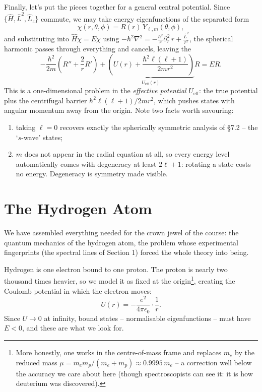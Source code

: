 \documentclass[a4paper]{scrartcl}
\begin{document}
Finally, let's put the pieces together for a general central potential. Since $\{\hat H, \hat L^2, \hat L_z\}$ commute, we may take energy eigenfunctions of the separated form
$$
\chi(r, \theta, \phi) = R(r) \, Y_{\ell, m}(\theta, \phi),
$$
and substituting into $\hat{H}\chi = E\chi$ using $-\hbar^2\nabla^2 = -\frac{\hbar^2}{r}\partial_r^2 \, r + \frac{\hat{L}^2}{r^2}$, the spherical harmonic passes through everything and cancels, leaving the 
$$
-\frac{\hbar^2}{2m}\left( R'' + \frac{2}{r}R' \right) + \underbrace{\left( U(r) + \frac{\hbar^2 \ell(\ell+1)}{2mr^2} \right)}_{U_{\text{eff}}(r)} R = E R.
$$
This is a one-dimensional problem in the \emph{effective potential} $U_{\text{eff}}$: the true potential plus the centrifugal barrier $\hbar^2\ell(\ell+1)/2mr^2$, which pushes states with angular momentum away from the origin. Note two facts worth savouring:
\begin{enumerate}[label=(\roman*)]
    \item taking $\ell = 0$ recovers exactly the spherically symmetric analysis of \S 7.2 -- the `$s$-wave' states;
    \item $m$ does not appear in the radial equation at all, so every energy level automatically comes with degeneracy at least $2\ell + 1$: rotating a state costs no energy. Degeneracy is symmetry made visible.
\end{enumerate}

\section{The Hydrogen Atom}

We have assembled everything needed for the crown jewel of the course: the quantum mechanics of the hydrogen atom, the problem whose experimental fingerprints (the spectral lines of Section 1) forced the whole theory into being.

Hydrogen is one electron bound to one proton. The proton is nearly two thousand times heavier, so we model it as fixed at the origin\footnote{More honestly, one works in the centre-of-mass frame and replaces $m_e$ by the reduced mass $\mu = m_e m_p/(m_e + m_p) \approx 0.9995 \, m_e$ -- a correction well below the accuracy we care about here (though spectroscopists can see it: it is how deuterium was discovered).}, creating the Coulomb potential in which the electron moves:
$$
U(r) = -\frac{e^2}{4 \pi \epsilon_0} \cdot \frac{1}{r}.
$$
Since $U \rightarrow 0$ at infinity, bound states -- normalisable eigenfunctions -- must have $E < 0$, and these are what we look for.
\end{document}
